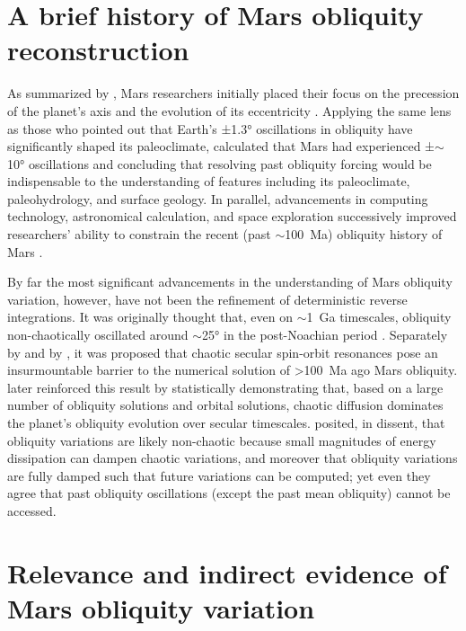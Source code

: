 \documentclass{ucetd}
\begin{document}
\section{A brief history of Mars obliquity reconstruction}
\label{section:1-2}

As summarized by \citet{laskar2004a}, Mars researchers initially placed their focus on the precession of the planet’s axis and the evolution of its eccentricity \citep{leighton1966a, murray1973a}. Applying the same lens as those who pointed out that Earth’s ±1.3° oscillations in obliquity have significantly shaped its paleoclimate, \citet{ward1973a} calculated that Mars had experienced ±$\sim$10° oscillations and concluding that resolving past obliquity forcing would be indispensable to the understanding of features including its paleoclimate, paleohydrology, and surface geology. In parallel, advancements in computing technology, astronomical calculation, and space exploration successively improved researchers’ ability to constrain the recent (past $\sim$100~Ma) obliquity history of Mars \citep[e.g.,][]{brouwer1950a, bretagnon1974a, laskar1988a, folkner1997a, yoder1997a}.

By far the most significant advancements in the understanding of Mars obliquity variation, however, have not been the refinement of deterministic reverse integrations. It was originally thought that, even on $\sim$1~Ga timescales, obliquity non-chaotically oscillated around $\sim$25° in the post-Noachian period \citep{ward1974a, ward1979a, ward1992a}. Separately by \citet{touma1993a} and by \citet{laskar1993a}, it was proposed that chaotic secular spin-orbit resonances pose an insurmountable barrier to the numerical solution of >100~Ma ago Mars obliquity. \citet{laskar2004a} later reinforced this result by statistically demonstrating that, based on a large number of obliquity solutions and orbital solutions, chaotic diffusion dominates the planet’s obliquity evolution over secular timescales. \citet{bills2019a} posited, in dissent, that obliquity variations are likely non-chaotic because small magnitudes of energy dissipation can dampen chaotic variations, and moreover that obliquity variations are fully damped such that future variations can be computed; yet even they agree that past obliquity oscillations (except the past mean obliquity) cannot be accessed.

\section{Relevance and indirect evidence of Mars obliquity variation}
\label{section:1-3}
\end{document}
